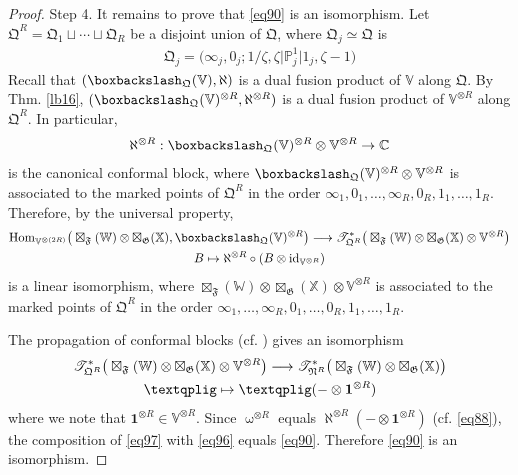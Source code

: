 \documentclass[11pt,b5paper,notitlepage]{article}
\theoremstyle{definition}
\theoremstyle{plain}
\newcommand{\idt}{\mathbf{1}}
\newcommand{\Hom}{\mathrm{Hom}}
\newcommand{\Vbb}{\mathbb V}
\newcommand{\Xbb}{\mathbb X}
\newcommand{\Wbb}{\mathbb W}
\newcommand{\Cbb}{\mathbb C}
\newcommand{\Pbb}{\mathbb P}
\newcommand{\<}{\left\langle}
\renewcommand{\>}{\right\rangle}
\newcommand{\ST}{\mathscr{T}}
\newcommand{\bbs}{\boxbackslash}
\newcommand{\fq}{{\mathfrak Q}}
\newcommand{\id}{\mathrm{id}}
\newcommand{\fn}{\mathfrak{N}}
\newcommand{\ff}{\mathfrak{F}}
\newcommand{\fg}{\mathfrak{G}}
\newcommand{\tipxphi}{\text{\textqplig}}
\numberwithin{equation}{section}
\begin{document}
\begin{proof}
Step 4. It remains to prove that \eqref{eq90} is an isomorphism. Let $\fq^R=\fq_1\sqcup\cdots\sqcup\fq_R$ be a disjoint union of $\fq$, where $\fq_j\simeq\fq$ is 
\begin{align*}
\fq_j=\big(\infty_j,0_j;1/\zeta,\zeta\big|\Pbb^1_j\big|1_j,\zeta-1\big)
\end{align*}
Recall that $(\bbs_\fq(\Vbb),\aleph)$ is a dual fusion product of $\Vbb$ along $\fq$. By Thm. \ref{lb16}, $(\bbs_\fq(\Vbb)^{\otimes R},\aleph^{\otimes R})$ is a dual fusion product of $\Vbb^{\otimes R}$ along $\fq^R$. In particular,
\begin{align*}
\aleph^{\otimes R}:\bbs_\fq(\Vbb)^{\otimes R}\otimes\Vbb^{\otimes R}\rightarrow\Cbb
\end{align*}
is the canonical conformal block, where $\bbs_\fq(\Vbb)^{\otimes R}\otimes\Vbb^{\otimes R}$ is associated to the marked points of $\fq^R$ in the order $\infty_1,0_1,\dots,\infty_R,0_R,1_1,\dots,1_R$. Therefore, by the universal property,
\begin{gather}\label{eq96}
\begin{gathered}
\Hom_{\Vbb^{\otimes(2R)}}\big(\boxtimes_\ff(\Wbb)\otimes\boxtimes_\fg(\Xbb),\bbs_\fq(\Vbb)^{\otimes R}\big)\longrightarrow \ST^*_{\fq^R}\big(\boxtimes_\ff(\Wbb)\otimes\boxtimes_\fg(\Xbb)\otimes\Vbb^{\otimes R}\big)\\
B\mapsto \aleph^{\otimes R}\circ (B\otimes\id_{\Vbb^{\otimes R}})
\end{gathered}
\end{gather}
is a linear isomorphism, where $\boxtimes_\ff(\Wbb)\otimes\boxtimes_\fg(\Xbb)\otimes\Vbb^{\otimes R}$ is associated to the marked points of $\fq^R$ in the order $\infty_1,\dots,\infty_R,0_1,\dots,0_R,1_1,\dots,1_R$.


The propagation of conformal blocks (cf. \cite[Cor. 2.44]{GZ1}) gives an isomorphism
\begin{gather}\label{eq97}
\begin{gathered}
\ST^*_{\fq^R}\big(\boxtimes_\ff(\Wbb)\otimes\boxtimes_\fg(\Xbb)\otimes\Vbb^{\otimes R}\big)\longrightarrow \ST^*_{\fn^R}\big(\boxtimes_\ff(\Wbb)\otimes\boxtimes_\fg(\Xbb)\big)\\
\tipxphi\mapsto \tipxphi(-\otimes\idt^{\otimes R})
\end{gathered}
\end{gather}
where we note that $\idt^{\otimes R}\in\Vbb^{\otimes R}$. Since $\upomega^{\otimes R}$ equals $\aleph^{\otimes R}(-\otimes\idt^{\otimes R})$ (cf. \eqref{eq88}), the composition of \eqref{eq97} with \eqref{eq96} equals \eqref{eq90}. Therefore \eqref{eq90} is an isomorphism.
\end{proof}
\end{document}
